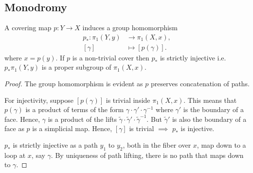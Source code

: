 \subsection{Monodromy}
\begin{proposition}
  A covering map $p:Y \rightarrow X$ induces a group homomorphism
  \begin{align*}
    p_* : \pi_1(Y,y) &\longrightarrow \pi_1(X,x), \\
    [\gamma] &\longmapsto [p(\gamma)].
  \end{align*}
  where $x = p(y)$.
  If $p$ is a non-trivial cover then $p_*$ is strictly injective i.e. $p_*\pi_1(Y,y)$ is a proper subgroup of $\pi_1(X,x)$.
\end{proposition}
\begin{proof}
  The group homomorphism is evident as $p$ preserves concatenation of paths.

  For injectivity, suppose $[p(\gamma)]$ is trivial inside $\pi_1(X,x)$.
  This means that $p(\gamma)$ is a product of terms of the form $\gamma \cdot \gamma' \cdot \gamma^{-1}$ where $\gamma'$ is the boundary of a face. Hence, $\gamma$ is a product of the lifts $\widetilde{\gamma} \cdot \widetilde{\gamma}' \cdot \widetilde{\gamma}^{-1}$.
  But $\widetilde{\gamma}'$ is also the boundary of a face as $p$ is a simplicial map.
  Hence, $[{\gamma}]$ is trivial $\implies$ $p_*$ is injective.

  $p_*$ is strictly injective as a path $y_1$ to $y_2$, both in the fiber over $x$, map down to a loop at $x$, say $\gamma$.
  By uniqueness of path lifting, there is no path that maps down to $\gamma$.
\end{proof}

